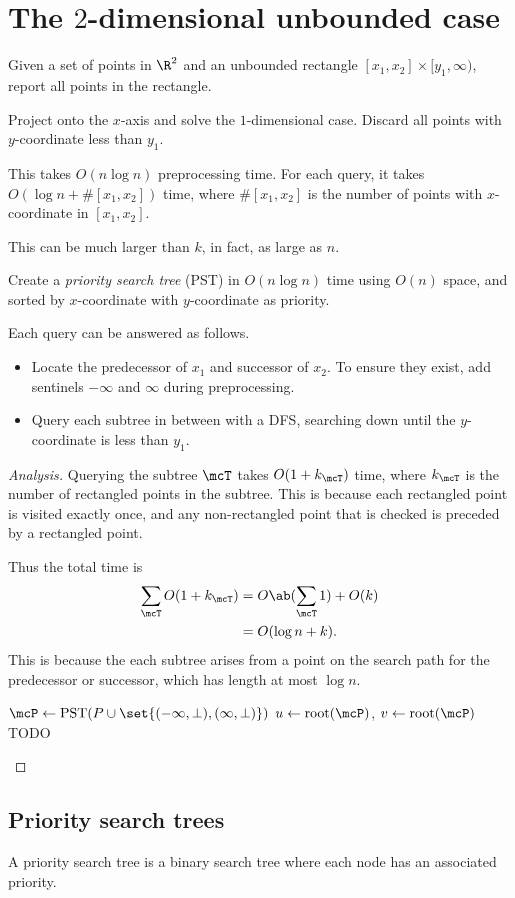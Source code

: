 \section{The $2$-dimensional unbounded case} \label{sec:ors:2d-unbounded}
\begin{question*}
    Given a set of points in $\R^2$ and an unbounded rectangle
    $[x_1, x_2] \times [y_1, \infty)$, report all points in the rectangle.
\end{question*}
\begin{solution}[Naive]
    Project onto the $x$-axis and solve the $1$-dimensional case.
    Discard all points with $y$-coordinate less than $y_1$.

    This takes $O(n \log n)$ preprocessing time.
    For each query, it takes $O(\log n + \#[x_1, x_2])$ time,
    where $\#[x_1, x_2]$ is the number of points with $x$-coordinate
    in $[x_1, x_2]$.
\end{solution}
This can be much larger than $k$, in fact, as large as $n$.

\begin{solution}
    Create a \emph{priority search tree} (PST) in $O(n \log n)$ time
    using $O(n)$ space, and sorted by $x$-coordinate with $y$-coordinate
    as priority.

    Each query can be answered as follows.
    \begin{itemize}
        \item Locate the predecessor of $x_1$ and successor of $x_2$.
        To ensure they exist, add sentinels $-\infty$ and $\infty$ during
        preprocessing.
        \item Query each subtree in between with a DFS, searching down until
        the $y$-coordinate is less than $y_1$. \qedhere
    \end{itemize}
\end{solution}
\begin{proof}[Analysis]
    Querying the subtree $\mcT$ takes $O(1 + k_\mcT)$ time, where
    $k_\mcT$ is the number of rectangled points in the subtree.
    This is because each rectangled point is visited exactly once,
    and any non-rectangled point that is checked is preceded by a
    rectangled point.

    Thus the total time is \begin{align*}
        \sum_\mcT O(1 + k_\mcT) &= O\ab(\sum_\mcT 1) + O(k) \\
        &= O(\log n + k).
    \end{align*}
    This is because the each subtree arises from a point on the search path
    for the predecessor or successor, which has length at most $\log n$.
    \begin{algo}
            \State $\mcP \gets \text{PST}(P \cup \set{(-\infty, \bot), (\infty, \bot)})$
            \State $u \gets \text{root}(\mcP)$, $v \gets \text{root}(\mcP)$
                \State TODO %
            \EndWhile
        \EndFn
    \end{algo}
\end{proof}

\subsection{Priority search trees} \label{sec:ors:pst}
A priority search tree is a binary search tree where each node has an
associated priority.

